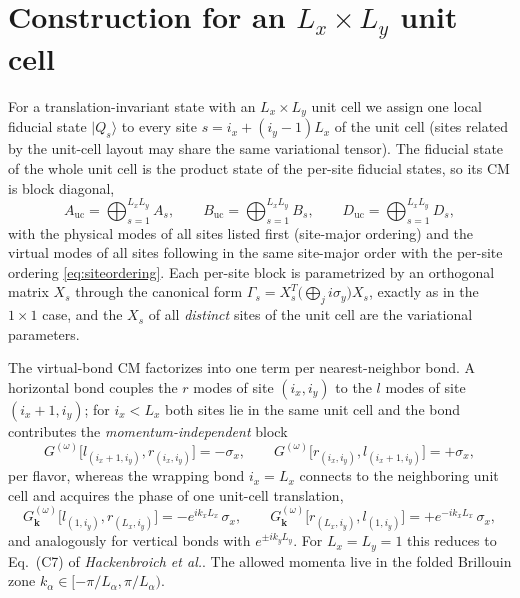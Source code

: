 \documentclass[11pt,a4paper]{article}
\newcommand{\uc}{\mathrm{uc}}
\begin{document}
\section{Construction for an $L_x \times L_y$ unit cell}

For a translation-invariant state with an $L_x \times L_y$ unit cell we
assign one local fiducial state $|Q_s\rangle$ to every site
$s = i_x + (i_y - 1) L_x$ of the unit cell (sites related by the unit-cell
layout may share the same variational tensor). The fiducial state of the
whole unit cell is the product state of the per-site fiducial states, so its
CM is block diagonal,
\begin{equation}
  A_{\uc} = \bigoplus_{s=1}^{L_x L_y} A_s , \qquad
  B_{\uc} = \bigoplus_{s=1}^{L_x L_y} B_s , \qquad
  D_{\uc} = \bigoplus_{s=1}^{L_x L_y} D_s ,
  \label{eq:blockdiagABD}
\end{equation}
with the physical modes of all sites listed first (site-major ordering) and
the virtual modes of all sites following in the same site-major order with
the per-site ordering \eqref{eq:siteordering}. Each per-site block is
parametrized by an orthogonal matrix $X_s$ through the canonical form
$\Gamma_s = X_s^{T} \big(\bigoplus_{j} i\sigma_y\big) X_s$, exactly as in the
$1\times 1$ case, and the $X_s$ of all \emph{distinct} sites of the unit
cell are the variational parameters.

The virtual-bond CM factorizes into one term per nearest-neighbor bond. A
horizontal bond couples the $r$ modes of site $(i_x, i_y)$ to the $l$ modes
of site $(i_x{+}1, i_y)$; for $i_x < L_x$ both sites lie in the same unit
cell and the bond contributes the \emph{momentum-independent} block
\begin{equation}
  G^{(\omega)}\big[l_{(i_x+1,i_y)}, r_{(i_x,i_y)}\big] = -\sigma_x ,
  \qquad
  G^{(\omega)}\big[r_{(i_x,i_y)}, l_{(i_x+1,i_y)}\big] = +\sigma_x ,
\end{equation}
per flavor, whereas the wrapping bond $i_x = L_x$ connects to the
neighboring unit cell and acquires the phase of one unit-cell translation,
\begin{equation}
  G^{(\omega)}_{\bm k}\big[l_{(1,i_y)}, r_{(L_x,i_y)}\big]
  = -e^{i k_x L_x}\,\sigma_x ,
  \qquad
  G^{(\omega)}_{\bm k}\big[r_{(L_x,i_y)}, l_{(1,i_y)}\big]
  = +e^{-i k_x L_x}\,\sigma_x ,
  \label{eq:wrapbond}
\end{equation}
and analogously for vertical bonds with $e^{\pm i k_y L_y}$. For
$L_x = L_y = 1$ this reduces to Eq.~(C7) of \emph{Hackenbroich et al.}.
The allowed momenta live in the folded Brillouin zone
$k_\alpha \in [-\pi/L_\alpha, \pi/L_\alpha)$.
\end{document}
